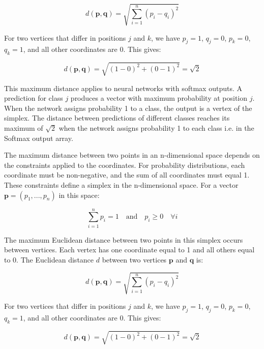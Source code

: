 \begin{equation}
d(\mathbf{p}, \mathbf{q}) = \sqrt{\sum_{i=1}^n (p_i - q_i)^2}
\end{equation}

For two vertices that differ in positions $j$ and $k$, we have $p_j = 1$, $q_j = 0$, $p_k = 0$, $q_k = 1$, and all other coordinates are 0. This gives:

\begin{equation}
d(\mathbf{p}, \mathbf{q}) = \sqrt{(1-0)^2 + (0-1)^2} = \sqrt{2}
\end{equation}

This maximum distance applies to neural networks with softmax outputs. A prediction for class $j$ produces a vector with maximum probability at position $j$. When the network assigns probability 1 to a class, the output is a vertex of the simplex. The distance between predictions of different classes reaches its maximum of $\sqrt{2}$ when the network assigns probability 1 to each class i.e. in the Softmax output array.

The maximum distance between two points in an n-dimensional space depends on the constraints applied to the coordinates. For probability distributions, each coordinate must be non-negative, and the sum of all coordinates must equal 1. These constraints define a simplex in the n-dimensional space. For a vector $\mathbf{p} = (p_1, ..., p_n)$ in this space:

\begin{equation}
\sum_{i=1}^n p_i = 1 \quad \text{and} \quad p_i \geq 0 \quad \forall i
\end{equation}

The maximum Euclidean distance between two points in this simplex occurs between vertices. Each vertex has one coordinate equal to 1 and all others equal to 0. The Euclidean distance $d$ between two vertices $\mathbf{p}$ and $\mathbf{q}$ is:

\begin{equation}
d(\mathbf{p}, \mathbf{q}) = \sqrt{\sum_{i=1}^n (p_i - q_i)^2}
\end{equation}

For two vertices that differ in positions $j$ and $k$, we have $p_j = 1$, $q_j = 0$, $p_k = 0$, $q_k = 1$, and all other coordinates are 0. This gives:

\begin{equation}
d(\mathbf{p}, \mathbf{q}) = \sqrt{(1-0)^2 + (0-1)^2} = \sqrt{2}
\end{equation}

